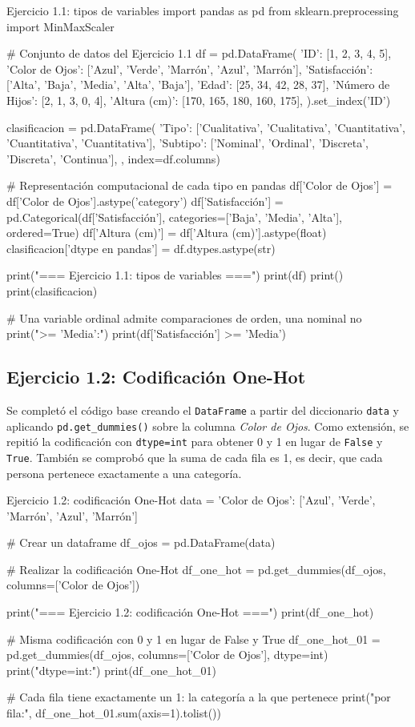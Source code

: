 \documentclass[11pt,letterpaper]{article}
\begin{document}
\begin{codigo}[label=cod:ej11]{Ejercicio 1.1: tipos de variables}
import pandas as pd
from sklearn.preprocessing import MinMaxScaler

# Conjunto de datos del Ejercicio 1.1
df = pd.DataFrame({
    'ID': [1, 2, 3, 4, 5],
    'Color de Ojos': ['Azul', 'Verde', 'Marrón', 'Azul', 'Marrón'],
    'Satisfacción': ['Alta', 'Baja', 'Media', 'Alta', 'Baja'],
    'Edad': [25, 34, 42, 28, 37],
    'Número de Hijos': [2, 1, 3, 0, 4],
    'Altura (cm)': [170, 165, 180, 160, 175],
}).set_index('ID')

clasificacion = pd.DataFrame({
    'Tipo': ['Cualitativa', 'Cualitativa', 'Cuantitativa', 'Cuantitativa', 'Cuantitativa'],
    'Subtipo': ['Nominal', 'Ordinal', 'Discreta', 'Discreta', 'Continua'],
}, index=df.columns)

# Representación computacional de cada tipo en pandas
df['Color de Ojos'] = df['Color de Ojos'].astype('category')
df['Satisfacción'] = pd.Categorical(df['Satisfacción'],
                                    categories=['Baja', 'Media', 'Alta'], ordered=True)
df['Altura (cm)'] = df['Altura (cm)'].astype(float)
clasificacion['dtype en pandas'] = df.dtypes.astype(str)

print("=== Ejercicio 1.1: tipos de variables ===")
print(df)
print()
print(clasificacion)

# Una variable ordinal admite comparaciones de orden, una nominal no
print(" >= 'Media':")
print(df['Satisfacción'] >= 'Media')
\end{codigo}

\subsection{Ejercicio 1.2: Codificación One-Hot}

Se completó el código base creando el \texttt{DataFrame} a partir del diccionario \texttt{data} y aplicando \texttt{pd.get\_dummies()} sobre la columna \textit{Color de Ojos}. Como extensión, se repitió la codificación con \texttt{dtype=int} para obtener 0 y 1 en lugar de \texttt{False} y \texttt{True}. También se comprobó que la suma de cada fila es 1, es decir, que cada persona pertenece exactamente a una categoría.

\begin{codigo}[label=cod:ej12]{Ejercicio 1.2: codificación One-Hot}
data = {
    'Color de Ojos': ['Azul', 'Verde', 'Marrón', 'Azul', 'Marrón']
}

# Crear un dataframe
df_ojos = pd.DataFrame(data)

# Realizar la codificación One-Hot
df_one_hot = pd.get_dummies(df_ojos, columns=['Color de Ojos'])

print("\n=== Ejercicio 1.2: codificación One-Hot ===")
print(df_one_hot)

# Misma codificación con 0 y 1 en lugar de False y True
df_one_hot_01 = pd.get_dummies(df_ojos, columns=['Color de Ojos'], dtype=int)
print("\nCon dtype=int:")
print(df_one_hot_01)

# Cada fila tiene exactamente un 1: la categoría a la que pertenece
print("\nSuma por fila:", df_one_hot_01.sum(axis=1).tolist())
\end{codigo}
\end{document}
